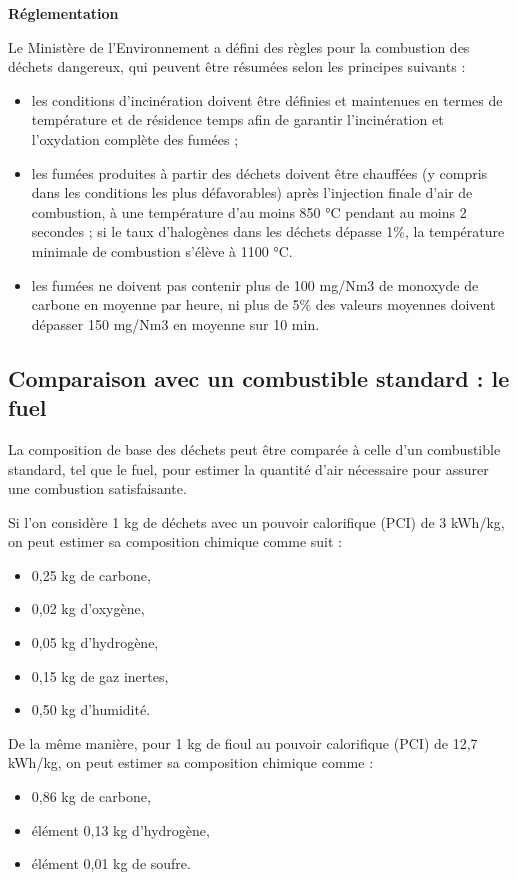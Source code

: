\vspace{0.3cm}
\textbf{Réglementation}
\vspace{0.3cm}

Le Ministère de l'Environnement a défini des règles pour la combustion des déchets dangereux, qui peuvent être résumées selon les principes suivants :
\begin{itemize}
    \item les conditions d'incinération doivent être définies et maintenues en termes de température et de résidence temps afin de garantir l'incinération et l'oxydation complète des fumées ;
    \item les fumées produites à partir des déchets doivent être chauffées (y compris dans les conditions les plus défavorables) après l'injection finale d'air de combustion, à une température d'au moins 850 °C pendant au moins 2 secondes ; si le taux d'halogènes dans les déchets dépasse 1\%, la température minimale de combustion s'élève à 1100 °C.
    \item les fumées ne doivent pas contenir plus de 100 mg/Nm3 de monoxyde de carbone en moyenne par heure, ni plus de 5\% des valeurs moyennes doivent dépasser 150 mg/Nm3 en moyenne sur 10 min.

\end{itemize}

\subsection{Comparaison avec un combustible standard : le fuel}

La composition de base des déchets peut être comparée à celle d'un combustible standard, tel que le fuel, pour estimer la quantité d'air nécessaire pour assurer une combustion satisfaisante.


Si l'on considère 1 kg de déchets avec un pouvoir calorifique (PCI) de 3 kWh/kg, on peut estimer sa composition chimique comme suit :
\begin{itemize}
    \item 0,25 kg de carbone,
    \item 0,02 kg d'oxygène,
    \item 0,05 kg d'hydrogène,
    \item 0,15 kg de gaz inertes,
    \item 0,50 kg d'humidité.
    
\end{itemize}

De la même manière, pour 1 kg de fioul au pouvoir calorifique (PCI) de 12,7 kWh/kg, on peut estimer sa composition chimique comme :
\begin{itemize}
    \item 0,86 kg de carbone,
    \item élément 0,13 kg d'hydrogène,
    \item élément 0,01 kg de soufre.
\end{itemize}
 

